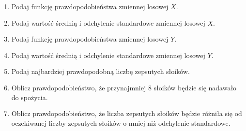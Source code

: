 \documentclass[twoside]{mwart}
\begin{document}
\begin{enumerate}
\begin{enumerate}
\item Podaj funkcję prawdopodobieństwa zmiennej losowej $X$.
\item Podaj wartość średnią i odchylenie standardowe zmiennej losowej $X$.
\item Podaj funkcję prawdopodobieństwa zmiennej losowej $Y$.
\item Podaj wartość średnią i odchylenie standardowe zmiennej losowej $Y$.
\item Podaj najbardziej prawdopodobną liczbę zepsutych słoików.
\item Oblicz prawdopodobieństwo, że przynajmniej 8 słoików będzie się nadawało do spożycia.
\item Oblicz prawdopodobieństwo, że liczba zepsutych słoików będzie różniła się od oczekiwanej liczby zepsutych słoików o mniej niż odchylenie standardowe.
\end{enumerate}


\end{enumerate}
\vfill
\end{document}
